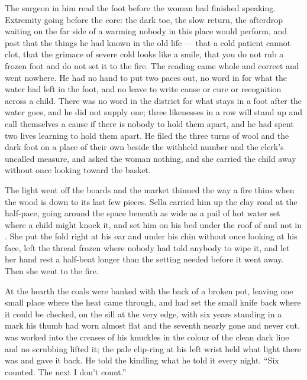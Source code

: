 The surgeon in him read the foot before the woman had finished speaking. Extremity going before the core: the dark toe, the slow return, the afterdrop waiting on the far side of a warming nobody in this place would perform, and past that the things he had known in the old life --- that a cold patient cannot clot, that the grimace of severe cold looks like a smile, that you do not rub a frozen foot and do not set it to the fire. The reading came whole and correct and went nowhere. He had no hand to put two paces out, no word in  for what the water had left in the foot, and no leave to write cause or cure or recognition across a child. There was no word in the district for what stays in a foot after the water goes, and he did not supply one; three likenesses in a row will stand up and call themselves a cause if there is nobody to hold them apart, and he had spent two lives learning to hold them apart. He filed the three turns of wool and the dark foot on a place of their own beside the withheld number and the clerk's uncalled measure, and asked the woman nothing, and she carried the child away without once looking toward the basket.

\scenebreak

The light went off the boards and the market thinned the way a fire thins when the wood is down to its last few pieces. Sella carried him up the clay road at the half-pace, going around the space beneath  as wide as a pail of hot water set where a child might knock it, and set him on his bed under the roof of  and not in . She put the fold right at his ear and under his chin without once looking at his face, left the thread frozen where nobody had told anybody to wipe it, and let her hand rest a half-beat longer than the setting needed before it went away. Then she went to the fire.

At the hearth the coals were banked with the back of a broken pot, leaving one small place where the heat came through, and  had set the small knife back where it could be checked, on the sill at the very edge, with six years standing in a mark his thumb had worn almost flat and the seventh nearly gone and never cut.  was worked into the creases of his knuckles in the colour of the clean dark line and no scrubbing lifted it; the pale clip-ring at his left wrist held what light there was and gave it back. He told the kindling what he told it every night. “Six counted. The next I don't count.”

